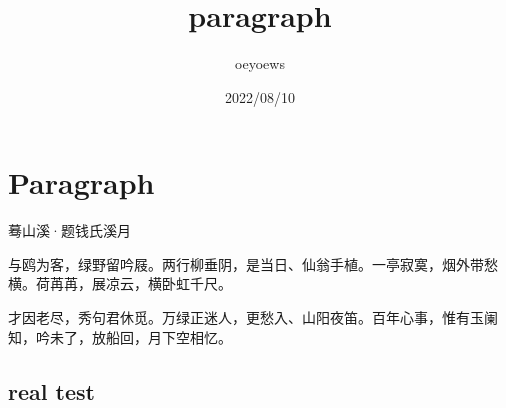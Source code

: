 \documentclass{ctexart}
\title{paragraph}
\author{oeyoews}
\date{2022/08/10}
\begin{document}
\maketitle

\section{Paragraph}%
\label{sec:Paragraph}

\centerline{ 蓦山溪·题钱氏溪月 }

与鸥为客，绿野留吟屐。两行柳垂阴，是当日、仙翁手植。一亭寂寞，烟外带愁横。荷苒苒，展凉云，横卧虹千尺。

才因老尽，秀句君休觅。万绿正迷人，更愁入、山阳夜笛。百年心事，惟有玉阑知，吟未了，放船回，月下空相忆。

\subsection{real test}%
\label{sub:real test}
\end{document}
